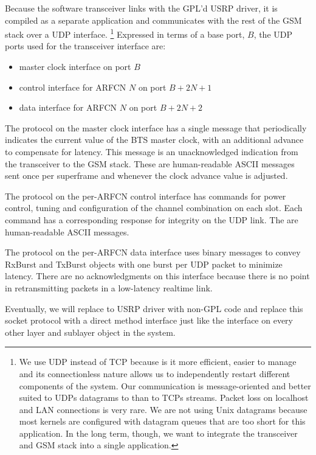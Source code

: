 \documentclass[11pt]{book}
\begin{document}
Because the software transceiver links with the GPL'd USRP driver, it is compiled as a separate application and communicates with the rest of the GSM stack over a UDP interface.%
\footnote{We use UDP instead of TCP because is it more efficient, easier to manage and its connectionless nature allows us to independently restart different components of the system.  Our communication is message-oriented and better suited to UDPs datagrams to than to TCPs streams.  Packet loss on localhost and LAN connections is very rare.  We are not using Unix datagrams because most kernels are configured with datagram queues that are too short for this application.  In the long term, though, we want to integrate the transceiver and GSM stack into a single application.}
Expressed in terms of a base port, $B$, the UDP ports used for the transceiver interface are:
\begin{itemize}
	\item master clock interface on port $B$
	\item control interface for ARFCN $N$ on port $B+2N+1$
	\item data interface for ARFCN $N$ on port $B+2N+2$
\end{itemize}

The protocol on the master clock interface has a single message that periodically indicates the current value of the BTS master clock, with an additional advance to compensate for latency.  This message is an unacknowledged indication from the transceiver to the GSM stack.  These are human-readable ASCII messages sent once per superframe and whenever the clock advance value is adjusted.

The protocol on the per-ARFCN control interface has commands for power control, tuning and configuration of the channel combination on each slot.  Each command has a corresponding response for integrity on the UDP link.  The are human-readable ASCII messages.

The protocol on the per-ARFCN data interface uses binary messages to convey RxBurst and TxBurst objects with one burst per UDP packet to minimize latency.  There are no acknowledgments on this interface because there is no point in retransmitting packets in a low-latency realtime link.

Eventually, we will replace to USRP driver with non-GPL code and replace this socket protocol with a direct method interface just like the interface on every other layer and sublayer object in the system.
\end{document}
